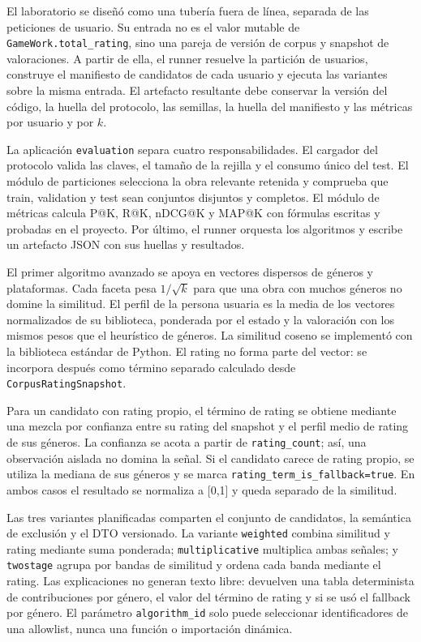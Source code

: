 El laboratorio se diseñó como una tubería fuera de línea, separada de las peticiones de
usuario. Su entrada no es el valor mutable de \texttt{GameWork.total\_rating}, sino una
pareja de versión de corpus y snapshot de valoraciones. A partir de ella, el runner resuelve
la partición de usuarios, construye el manifiesto de candidatos de cada usuario y ejecuta
las variantes sobre la misma entrada. El artefacto resultante debe conservar la versión del
código, la huella del protocolo, las semillas, la huella del manifiesto y las métricas por
usuario y por $k$.

La aplicación \texttt{evaluation} separa cuatro responsabilidades. El cargador del
protocolo valida las claves, el tamaño de la rejilla y el consumo único del test. El módulo
de particiones selecciona la obra relevante retenida y comprueba que train, validation y test
sean conjuntos disjuntos y completos. El módulo de métricas calcula P@K, R@K, nDCG@K y MAP@K
con fórmulas escritas y probadas en el proyecto. Por último, el runner orquesta los algoritmos
y escribe un artefacto JSON con sus huellas y resultados.

El primer algoritmo avanzado se apoya en vectores dispersos de géneros y plataformas. Cada
faceta pesa $1/\sqrt{k}$ para que una obra con muchos géneros no domine la similitud. El
perfil de la persona usuaria es la media de los vectores normalizados de su biblioteca,
ponderada por el estado y la valoración con los mismos pesos que el heurístico de géneros.
La similitud coseno se implementó con la biblioteca estándar de Python. El rating no forma
parte del vector: se incorpora después como término separado calculado desde
\texttt{CorpusRatingSnapshot}.

Para un candidato con rating propio, el término de rating se obtiene mediante una mezcla por
confianza entre su rating del snapshot y el perfil medio de rating de sus géneros. La
confianza se acota a partir de \texttt{rating\_count}; así, una observación aislada no domina
la señal. Si el candidato carece de rating propio, se utiliza la mediana de sus géneros y se
marca \texttt{rating\_term\_is\_fallback=true}. En ambos casos el resultado se normaliza a
[0,1] y queda separado de la similitud.

Las tres variantes planificadas comparten el conjunto de candidatos, la semántica de
exclusión y el DTO versionado. La variante \texttt{weighted} combina similitud y rating
mediante suma ponderada; \texttt{multiplicative} multiplica ambas señales; y
\texttt{twostage} agrupa por bandas de similitud y ordena cada banda mediante el rating.
Las explicaciones no generan texto libre: devuelven una tabla determinista de contribuciones
por género, el valor del término de rating y si se usó el fallback por género. El parámetro
\texttt{algorithm\_id} solo puede seleccionar identificadores de una allowlist, nunca una
función o importación dinámica.

